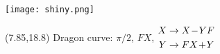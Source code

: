 \documentclass[final]{beamer}
\newcommand{\nt}{\negthinspace}
\newcommand{\m}{\nt-\nt}
\newcommand{\p}{\nt+\nt}
\begin{document}
\begin{frame}{}
\texttt{[image: shiny.png]}
\begin{textblock}{20}(7.85,18.8) %
Dragon curve: $\pi/2$, $FX$,
{\small
$\begin{aligned}
X &\to X\m YF \\
Y &\to FX\p Y
\end{aligned}$}
\end{textblock}
\end{frame}
\end{document}
